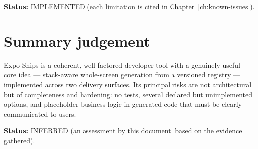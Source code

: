 \textbf{Status:} IMPLEMENTED (each limitation is cited in
Chapter~\ref{ch:known-issues}).

\section{Summary judgement}

Expo Snips is a coherent, well-factored developer tool with a genuinely useful
core idea --- stack-aware whole-screen generation from a versioned registry ---
implemented across two delivery surfaces. Its principal risks are not
architectural but of completeness and hardening: no tests, several declared but
unimplemented options, and placeholder business logic in generated code that must
be clearly communicated to users.

\textbf{Status:} INFERRED (an assessment by this document, based on the evidence
gathered).
